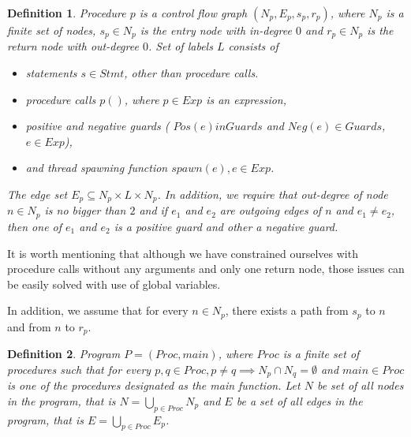 \documentclass[..thesis.tex]{subfiles}
\newtheorem{defin}{Definition}[section]
\begin{document}
\begin{defin}
Procedure $p$ is a \textit{control flow graph} $\left( N_p,E_p,s_p,r_p \right)$, where $N_p$ is a finite set of nodes, $s_p \in N_p$
 is the \textit{entry} node with in-degree $0$ and  $r_p \in N_p$ is the \textit{return} node with out-degree $0$. Set of labels $L$ consists of
\begin{itemize}
\item statements $s \in Stmt$, other than procedure calls.
\item procedure calls $p()$, where $p \in Exp$ is an expression, 
\item positive and negative guards ( $Pos\left( e \right) in Guards$ and  $Neg \left( e \right) \in Guards$, $e \in Exp$),
\item and thread spawning function $spawn\left( e \right), e \in Exp$.  
\end{itemize}
The edge set  $E_p \subseteq N_p \times L \times N_p$. In addition, we require that out-degree of node $n \in N_p$ is no bigger than $2$ 
and if $e_1$ and $e_2$ are outgoing edges of $n$ and $e_1 \neq e_2$, then one of $e_1$ and $e_2$ is a positive guard and other a negative guard. 
\end{defin}

It is worth mentioning that although we have constrained ourselves with procedure calls without any arguments and only one return node, those issues can be easily solved with use of global variables. 

In addition, we assume that for every $n \in N_p$, there exists a path from $s_p$ to $n$ and from $n$ to $r_p$.  

\begin{defin}
Program $P = \left( Proc, main \right)$, where $Proc$ is a finite set of procedures such that for every $p,q \in Proc, p \neq q \implies N_p \cap N_q = \emptyset$ and $main \in Proc$ is one of the procedures designated as the main function. Let $N$ be set of all nodes in the program, that is $N = \bigcup_{p \in Proc}N_p$ and $E$ be a set of all edges in the program, that is $E = \bigcup_{p \in Proc}E_p$. 
\end{defin}
\end{document}
